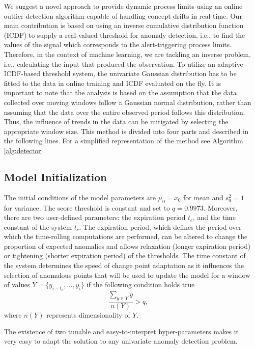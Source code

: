 We suggest a novel approach to provide dynamic process limits using an online outlier detection algorithm capable of handling concept drifts in real-time. Our main contribution is based on using an inverse cumulative distribution function (ICDF) to supply a real-valued threshold for anomaly detection, i.e., to find the values of the signal which corresponds to the alert-triggering process limits. Therefore, in the context of machine learning, we are tackling an inverse problem, i.e., calculating the input that produced the observation. To utilize an adaptive ICDF-based threshold system, the univariate Gaussian distribution has to be fitted to the data in online training and ICDF evaluated on the fly. It is important to note that the analysis is based on the assumption that the data collected over moving windows follow a Gaussian normal distribution, rather than assuming that the data over the entire observed period follows this distribution. Thus, the influence of trends in the data can be mitigated by selecting the appropriate window size. 
This method is divided into four parts and described in the following lines. For a simplified representation of the method see Algorithm \ref{alg:detector}.

\subsection{Model Initialization}\label{init}
The initial conditions of the model parameters are \(\mu_0 = x_0\) for mean and \(s^2_0 = 1\) for variance. The score threshold is constant and set to \(q = 0.9973\). Moreover, there are two user-defined parameters: the expiration period $t_e$, and the time constant of the system $t_c$. The expiration period, which defines the period over which the time-rolling computations are performed, can be altered to change the proportion of expected anomalies and allows relaxation (longer expiration period) or tightening (shorter expiration period) of the thresholds. The time constant of the system determines the speed of change point adaptation as it influences the selection of anomalous points that will be used to update the model for a window of values \(Y=\{y_{i-t_c},...,y_{i}\}\) if the following condition holds true
\begin{equation}
{\frac{\sum_{y\in Y}y}{n(Y)}} > q\text{,}\label{eq:condition}
\end{equation}
where \(n(Y)\) represents dimensionality of \(Y\).

The existence of two tunable and easy-to-interpret hyper-parameters makes it very easy to adapt the solution to any univariate anomaly detection problem.

